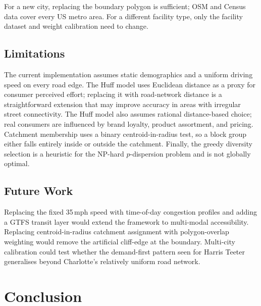 \documentclass[conference]{IEEEtran}
\begin{document}
For a new city, replacing the boundary polygon is sufficient; OSM and Census data cover every US metro area.  For a different facility type, only the facility dataset and weight calibration need to change.

\subsection{Limitations}

The current implementation assumes static demographics and a uniform
driving speed on every road edge.  The Huff model uses Euclidean
distance as a proxy for consumer perceived effort; replacing it with
road-network distance is a straightforward extension that may improve
accuracy in areas with irregular street connectivity.  The Huff model
also assumes rational distance-based choice; real consumers are
influenced by brand loyalty, product assortment, and pricing.
Catchment membership uses a binary centroid-in-radius test, so a block
group either falls entirely inside or outside the catchment.  Finally,
the greedy diversity selection is a heuristic for the NP-hard
$p$-dispersion problem and is not globally optimal.

\subsection{Future Work}

Replacing the fixed 35\,mph speed with time-of-day congestion profiles and adding a GTFS transit layer would extend the framework to multi-modal accessibility.  Replacing centroid-in-radius catchment assignment with polygon-overlap weighting would remove the artificial cliff-edge at the boundary.  Multi-city calibration could test whether the demand-first pattern seen for Harris Teeter generalises beyond Charlotte's relatively uniform road network.

\section{Conclusion}
\end{document}
